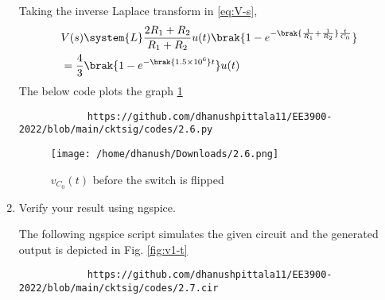 \documentclass[journal,12pt,twocolumn]{IEEEtran}
\renewcommand\thesection{\arabic{section}}
\begin{document}
\begin{enumerate}[label=\arabic*.,ref=\thesection.\theenumi]
		\solution Taking the inverse Laplace transform in \eqref{eq:V-s},
		\begin{align}
			&V(s) \system{L} \frac{2R_1 + R_2}{R_1 + R_2}u(t)\brak{1 - e^{-\brak{\frac{1}{R_1} + \frac{1}{R_2}}\frac{t}{C_0}}} \\
			&= \frac{4}{3}\brak{1 - e^{-\brak{1.5 \times 10^6}t}}u(t)
		\end{align}
		The below code plots the graph \ref{fig:v1-t}
		\begin{lstlisting}
			https://github.com/dhanushpittala11/EE3900-2022/blob/main/cktsig/codes/2.6.py
		\end{lstlisting}
		
		\begin{figure}[!htb]
			\texttt{[image: /home/dhanush/Downloads/2.6.png]}
			\caption{$v_{C_0}(t)$ before the switch is flipped}
			\label{fig:v1-t}
		\end{figure}
		\item Verify your result using ngspice.
		
		\solution The following ngspice script simulates the given circuit and the generated output is depicted in Fig. \eqref{fig:v1-t}
		\begin{lstlisting}
			https://github.com/dhanushpittala11/EE3900-2022/blob/main/cktsig/codes/2.7.cir
		\end{lstlisting}
	\end{enumerate}
	
\end{document}
